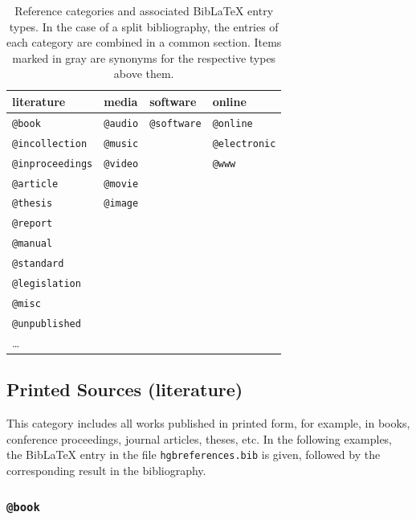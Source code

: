 \begin{table}
\caption{Reference categories and associated BibLaTeX entry types. In the case
of a split bibliography, the entries of each category are combined in a
common section. Items marked in gray are synonyms for the respective
types above them.}
\label{tab:reference-categories}
\centering
{}
\setlength{\tabcolsep}{4mm}
\begin{tabular}{@{}llll@{}}
	\toprule
	\textsf{literature} & \textsf{media} & \textsf{software} & \textsf{online} \\
	\midrule
	\texttt{@book} & \texttt{@audio} & \texttt{@software} & \texttt{@online} \\
	\texttt{@incollection} & \texttt{\color{midgray}@music} & & \texttt{\color{midgray}@electronic} \\
	\texttt{@inproceedings} & \texttt{@video} & & \texttt{\color{midgray}@www} \\
	\texttt{@article} & \texttt{@movie} & & \\
	\texttt{@thesis} & \texttt{@image} & & \\
	\texttt{@report} & & & \\
	\texttt{@manual} & & & \\
	\texttt{@standard} & & & \\
	\texttt{@legislation} & & & \\
	\texttt{@misc} & & &  \\
	\texttt{@unpublished} &  & & \\
	\ldots & & & \\
	\bottomrule
\end{tabular}
\end{table}


\subsection{Printed Sources (\textsf{literature})}
\label{sec:category-literature}

This category includes all works published in printed form, for example, in
books, conference proceedings, journal articles, theses, etc. In the following
examples, the BibLaTeX entry in the file \nolinkurl{hgbreferences.bib} is given,
followed by the corresponding result in the bibliography.

\subsubsection{\texttt{\bfseries @book}}
\label{sec:@book}

